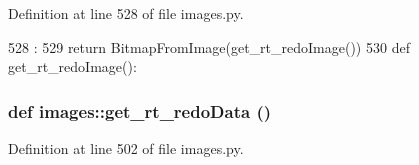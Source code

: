 Definition at line 528 of file images.py.


\begin{DoxyCode}
528                        :
529     return BitmapFromImage(get_rt_redoImage())
530 
def get_rt_redoImage():
\end{DoxyCode}
\hypertarget{namespaceimages_acdfb1d9e1961db1221bf13c458b6f4c8}{
\subsubsection[{get\_\-rt\_\-redoData}]{\setlength{\rightskip}{0pt plus 5cm}def images::get\_\-rt\_\-redoData ()}}
\label{namespaceimages_acdfb1d9e1961db1221bf13c458b6f4c8}


Definition at line 502 of file images.py.


